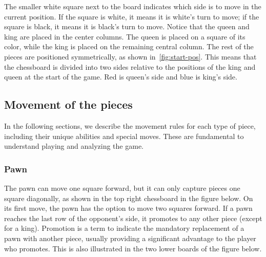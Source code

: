 \noindent The smaller white square next to the board indicates which side is to move in the current position. If the square is white, it means it is white's turn to move; if the square is black, it means it is black's turn to move. Notice that the queen and king are placed in the center columns. The queen is placed on a square of its color, while the king is placed on the remaining central column. The rest of the pieces are positioned symmetrically, as shown in~\cref{fig:start-pos}. This means that the chessboard is divided into two sides relative to the positions of the king and queen at the start of the game. Red is queen's side and blue is king's side.

\subsection*{Movement of the pieces}

In the following sections, we describe the movement rules for each type of piece, including their unique abilities and special moves. These are fundamental to understand playing and analyzing the game.

\subsubsection*{Pawn}

The pawn can move one square forward, but it can only capture pieces one square diagonally, as shown in the top right chessboard in the figure below. On its first move, the pawn has the option to move two squares forward. If a pawn reaches the last row of the opponent's side, it promotes to any other piece (except for a king). Promotion is a term to indicate the mandatory replacement of a pawn with another piece, usually providing a significant advantage to the player who promotes. This is also illustrated in the two lower boards of the figure below.

\newpage

